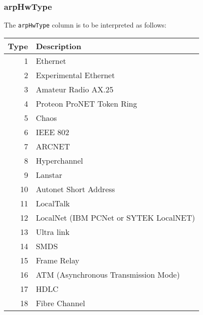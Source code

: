\documentclass[documentation]{subfiles}
\begin{document}
\subsubsection{arpHwType}\label{arpHwType}
The {\tt arpHwType} column is to be interpreted as follows:\\
\begin{minipage}{.48\textwidth}
    \small
    \begin{longtable}{rl}
        \toprule
        {\bf Type} & {\bf Description}\\
        \midrule\endhead%
         1 & Ethernet\\
         2 & Experimental Ethernet\\
         3 & Amateur Radio AX.25\\
         4 & Proteon ProNET Token Ring\\
         5 & Chaos\\
         6 & IEEE 802\\
         7 & ARCNET\\
         8 & Hyperchannel\\
         9 & Lanstar\\
        10 & Autonet Short Address\\
        11 & LocalTalk\\
        12 & LocalNet (IBM PCNet or SYTEK LocalNET)\\
        13 & Ultra link\\
        14 & SMDS\\
        15 & Frame Relay\\
        16 & ATM (Asynchronous Transmission Mode)\\
        17 & HDLC\\
        18 & Fibre Channel\\
        \bottomrule
    \end{longtable}
\end{minipage}
\hfill
\end{document}
